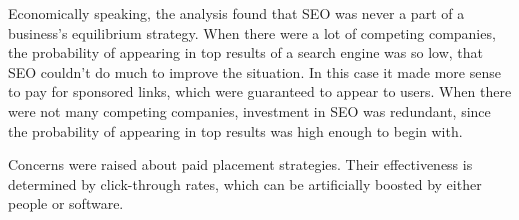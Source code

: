 \documentclass[../summaries.tex]{subfiles}
\begin{document}
Economically speaking, the analysis found that SEO was never a part of a business's equilibrium strategy. When there were a lot of competing companies, the probability of appearing in top results of a search engine was so low, that SEO couldn't do much to improve the situation. In this case it made more sense to pay for sponsored links, which were guaranteed to appear to users. When there were not many competing companies, investment in SEO was redundant, since the probability of appearing in top results was high enough to begin with.

Concerns were raised about paid placement strategies. Their effectiveness is determined by click-through rates, which can be artificially boosted by either people or software.
	
\end{document}
